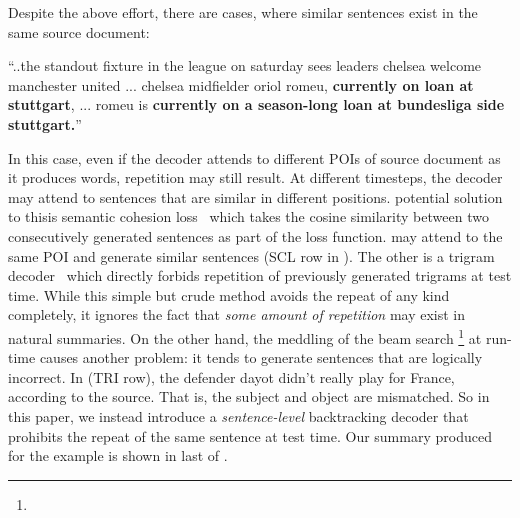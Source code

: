 Despite the above effort, there are cases, where similar sentences 
exist in the same source document:
\begin{example}
\label{ex:repeatsrc}
\small{``..the standout fixture in the league on saturday sees leaders 
	   chelsea welcome manchester united ... chelsea midfielder oriol romeu, 
\textbf{currently on loan at stuttgart}, ... romeu is 
\textbf{currently on a season-long loan at bundesliga side stuttgart.}''} 
\end{example}

In this case, even if the decoder attends to different POIs of 
source document as it produces words, repetition may still result.  
At different timesteps,
the decoder may attend 
to sentences that are similar in different positions.
\DIFdelbegin {}\DIFdelend \DIFaddbegin {}\DIFaddend potential solution to this\DIFaddbegin {}\DIFaddend is semantic cohesion loss~\cite{elikyilmazBHC18}
which takes the cosine similarity between two consecutively generated sentences
as part of the loss function. \DIFdelbegin {}\DIFdelend \DIFaddbegin {}\DIFaddend may attend to the same POI
and generate similar sentences (SCL row in ).  
The other is a trigram decoder~\cite{PaulusXS17} 
which directly forbids repetition of previously generated trigrams at test time. 
While this simple but crude method avoids the repeat of any kind
completely, 
it ignores the fact that \textit{some amount of repetition} may exist
in natural summaries.  
On the other hand, the meddling of the beam search
\DIFaddbegin \DIFadd{~}\footnote{}
\DIFaddend at run-time causes another problem: 
it tends to generate sentences that are logically incorrect. 
In  (TRI row), the defender dayot didn't
really play for France, according to the source.
That is, the subject and object are mismatched.
So in this paper, we instead introduce a {\em sentence-level} backtracking decoder
that prohibits the repeat of the same sentence at test time.
\DIFaddbegin {} \DIFaddend Our summary produced for the example is shown in last \DIFdelbegin {}\DIFdelend \DIFaddbegin {}\DIFaddend of 
.

